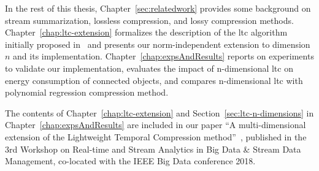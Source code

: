 
In the rest of this thesis, Chapter~\ref{sec:relatedwork} provides some
background on stream summarization, lossless compression, and lossy compression
methods. Chapter~\ref{chap:ltc-extension} formalizes the description of the
\acrshort{ltc} algorithm initially proposed
in~\cite{schoellhammer2004lightweight} and presents our norm-independent
extension to dimension $n$ and its implementation.
Chapter~\ref{chap:expsAndResults} reports on experiments to validate our
implementation, evaluates the impact of n-dimensional \acrshort{ltc} on
energy consumption of connected objects, and compares n-dimensional
\acrshort{ltc} with polynomial regression compression method.

The contents of Chapter~\ref{chap:ltc-extension} and
Section~\ref{sec:ltc-n-dimensions} in Chapter~\ref{chap:expsAndResults} are
included in our paper ``A multi-dimensional extension of the Lightweight
Temporal Compression method''~\cite{li2018multi}, published in the 3rd
Workshop on Real-time and Stream Analytics in Big Data \& Stream Data
Management, co-located with the IEEE Big Data conference 2018.
